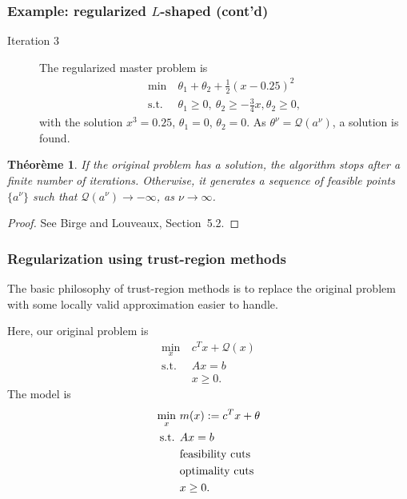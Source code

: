 \documentclass{beamer}
\newtheorem{theo}{Théorème}
\def\cQ{\mathcal{Q}}
\begin{document}
\begin{frame}
\frametitle{Example: regularized $L$-shaped (cont'd)}

\begin{description}
\item[Iteration 3]
The regularized master problem is
\begin{align*}
\min\ & \theta_1 + \theta_2 + \frac{1}{2}(x-0.25)^2 \\
\mbox{s.t. } & \theta_1 \geq 0,\ \theta_2 \geq -\frac{3}{4}x, \theta_2
\geq 0,
\end{align*}
with the solution $x^3 = 0.25$, $\theta_1 = 0$, $\theta_2 = 0$.
As $\theta^{\nu} = \mathcal{Q}(a^{\nu})$, a solution is found.
\end{description}

\begin{theo}
If the original problem has a solution, the algorithm stops after a finite number of iterations.
Otherwise, it generates a sequence of feasible points $\lbrace a^{\nu} \rbrace$ such that
$\mathcal{Q}(a^{\nu}) \rightarrow -\infty$, as $\nu \rightarrow \infty$.
\end{theo}
\begin{proof}
See Birge and Louveaux, Section~5.2.
\end{proof}
\end{frame}

\begin{frame}
\frametitle{Regularization using trust-region methods}

The basic philosophy of trust-region methods is to replace the original problem with some locally valid approximation easier to handle.

\mbox{}

Here, our original problem is
\begin{align*}
\min_x \ & c^T x + \cQ(x) \\
\mbox{s.t. } & Ax = b \\
& x \geq 0.
\end{align*}
The model is
\begin{align*}
\min_x \ & m(x) := c^T x + \theta \\
\mbox{s.t. } & Ax = b \\
& {\rm feasibility\ cuts} \\
& {\rm optimality\ cuts} \\
& x \geq 0.
\end{align*}
\end{frame}
\end{document}
